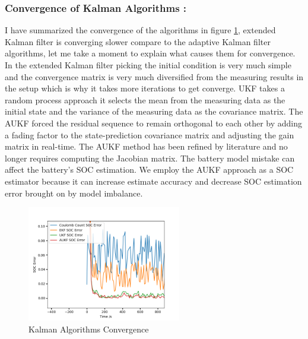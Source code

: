 \subsubsection{Convergence of Kalman Algorithms :}
I have summarized the convergence of the algorithms in figure \ref{fig:Kalman_Algorithms_Convergence}, extended Kalman filter is converging slower compare to the adaptive Kalman filter algorithms, let me take a moment to explain what causes them for convergence. In the extended Kalman filter picking the initial condition is very much simple and the convergence matrix is very much diversified from the measuring results in the setup which is why it takes more iterations to get converge. UKF takes a random process approach it selects the mean from the measuring data as the initial state and the variance of the measuring data as the covariance matrix. The AUKF forced the residual sequence to remain orthogonal to each other by adding a fading factor to the state-prediction covariance matrix and adjusting the gain matrix in real-time. The AUKF method has been refined by literature and no longer requires computing the Jacobian matrix. The battery model mistake can affect the battery's SOC estimation. We employ the AUKF approach as a SOC estimator because it can increase estimate accuracy and decrease SOC estimation error brought on by model imbalance.

\begin{figure}[h]
	\centering
	\includegraphics[width=0.6\textwidth]{Chap07/pyKalmanFilter/Python/Figures/KalmanAlgorithms_convergence.png}
	\caption{Kalman Algorithms Convergence }
	\label{fig:Kalman_Algorithms_Convergence}
\end{figure}

